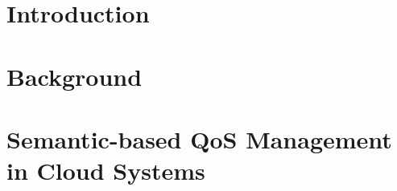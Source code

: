 \documentclass[preprint,12pt]{elsarticle}
\begin{document}
\section{Introduction}

\section{Background}

\section{Semantic-based QoS Management in Cloud Systems}

% 
% 
% 


\end{document}
